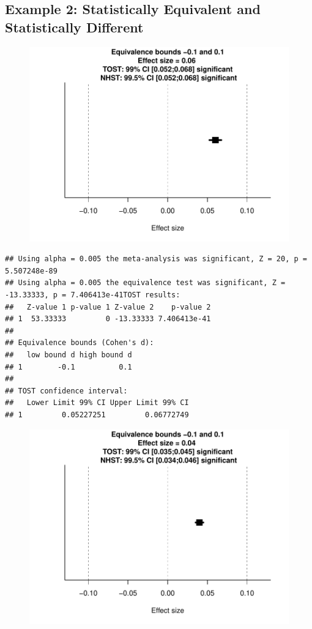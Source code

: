 \documentclass[english,man]{apa6}
\theoremstyle{definition}
\theoremstyle{definition}
\theoremstyle{definition}
\theoremstyle{remark}
\begin{document}
\subsection{Example 2: Statistically Equivalent and Statistically
Different}\label{example-2-statistically-equivalent-and-statistically-different}

\begin{figure}[htbp]
\centering
\includegraphics{manuscript_files/figure-latex/unnamed-chunk-7-1.pdf}
\caption{}
\end{figure}

\begin{verbatim}
## Using alpha = 0.005 the meta-analysis was significant, Z = 20, p = 5.507248e-89
## Using alpha = 0.005 the equivalence test was significant, Z = -13.33333, p = 7.406413e-41TOST results:
##   Z-value 1 p-value 1 Z-value 2    p-value 2
## 1  53.33333         0 -13.33333 7.406413e-41
## 
## Equivalence bounds (Cohen's d):
##   low bound d high bound d
## 1        -0.1          0.1
## 
## TOST confidence interval:
##   Lower Limit 99% CI Upper Limit 99% CI
## 1         0.05227251         0.06772749
\end{verbatim}

\begin{figure}[htbp]
\centering
\includegraphics{manuscript_files/figure-latex/unnamed-chunk-7-2.pdf}
\caption{}
\end{figure}
\end{document}
